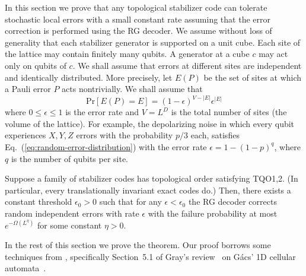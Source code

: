 In this section we prove that any topological stabilizer code can tolerate stochastic local errors with
a small constant rate assuming that the error correction is performed using the RG decoder.
We assume without loss of generality that each stabilizer generator is supported on a unit cube.
Each site of the lattice may contain finitely many qubits. A generator at a cube $c$ may act only on qubits of $c$.
We shall assume that errors at different sites are independent and identically distributed.
More precisely, let $E(P)$ be the set of sites at which a Pauli error $P$ acts nontrivially. We shall assume that
\begin{equation}
\mathrm{Pr}[E(P)=E] = (1- \epsilon)^{V-|E|} \epsilon^{|E|}
\label{eq:random-error-distribution}
\end{equation}
where $0 \le \epsilon \le 1$ is the error rate and $V=L^D$ is the total number of sites (the volume of the lattice).
For example, the depolarizing noise in which every qubit experiences $X,Y,Z$ errors
with the probability $p/3$ each, satisfies
Eq.~(\ref{eq:random-error-distribution}) with the error rate $\epsilon=1-(1-p)^q$, where $q$ is the number of qubits per site.
\begin{theorem}
Suppose a family of stabilizer codes has topological order satisfying TQO1,2.
(In particular, every translationally invariant exact codes do.)
Then, there exists a constant threshold $\epsilon_0>0$
such that for any $\epsilon<\epsilon_0$ the RG decoder corrects random independent errors with rate $\epsilon$
with the failure probability at most $e^{-\Omega(L^\eta)}$ for some constant $\eta>0$.
\label{thm:universal-threshold}
\end{theorem}
\noindent
In the rest of this section we prove the theorem.
Our proof borrows some techniques from \cite{Gray2001Guide,Gacs1986Reliable,Harrington2004thesis},
specifically Section~5.1 of Gray's review~\cite{Gray2001Guide} on G\'acs' 1D cellular automata~\cite{Gacs1986Reliable}.

